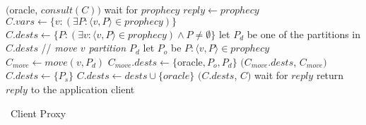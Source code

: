 \begin{algorithm}[h!]
\small

\begin{distribalgo}[1]

\vspace{1.0mm}


\vspace{1.0mm}

        \STATE \amcast$($oracle, $consult(C))$
        \STATE wait for $prophecy$
            \STATE $reply \leftarrow prophecy$
        \ELSE
            \STATE $C.vars \leftarrow \{v: (\exists P : \langle v, P \rangle \in prophecy) \}$
            \STATE $C.dests \leftarrow \{P : (\exists v : \langle v, P \rangle \in prophecy ) \wedge P \neq \emptyset\}$
                \STATE let $P_d$ be one of the partitions in $C.dests$
                    \STATE // \textit{move $v$ partition $P_d$}
                    \STATE let $P_o$ be $P : \langle v, P \rangle \in prophecy$
                        \STATE $C_{move} \leftarrow move(v,P_d)$
                        \STATE $C_{move}.dests \leftarrow \{$oracle$,P_o,P_d\}$    
                        \STATE \amcast$(C_{move}.dests$, $C_{move})$
                    \ENDIF
                \ENDFOR
                \STATE $C.dests \leftarrow \{ P_s \}$
            \ENDIF
                \STATE $C.dests \leftarrow dests \cup \{oracle\}$
            \ENDIF
            \STATE \amcast$(C.dests$, $C)$
            \STATE wait for $reply$
        \ENDIF
    \ENDINDENT
    \STATE return $reply$ to the application client
\ENDINDENT

\caption{\dssmr\ Client Proxy}
\label{alg:client_proxy}
\end{distribalgo}
\end{algorithm}